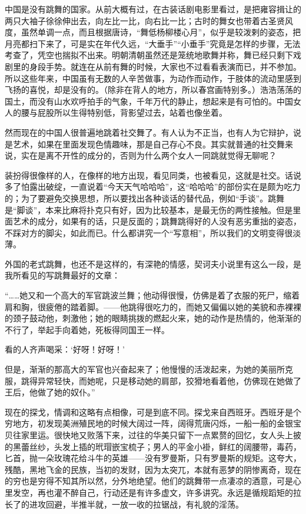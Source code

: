 \par 中国是没有跳舞的国家。从前大概有过，在古装话剧电影里看过，是把雍容揖让的两只大袖子徐徐伸出去，向左比一比，向右比一比；古时的舞女也带着古圣贤风度，虽然单调一点，而且根据唐诗，“舞低杨柳楼心月”，似乎是较泼剌的姿态，把月亮都扫下来了，可是实在年代久远，“大垂手”“小垂手”究竟是怎样的步骤，无法考查了，凭空也揣拟不出来。明朝清朝虽然还是笼统地歌舞并称，舞已经只剩下戏剧里的身段手势。就连在从前有舞的时候，大家也不过看看表演而已，并不参加。所以这些年来，中国虽有无数的人辛苦做事，为动作而动作，于肢体的流动里感到飞扬的喜悦，却是没有的。（除非在背人的地方，所以春宫画特别多。）浩浩荡荡的国土，而没有山水欢呼拍手的气象，千年万代的静止，想起来是有可怕的。中国女人的腰与屁股所以生得特别低，背影望过去，站着也像坐着。
\par 然而现在的中国人很普遍地跳着社交舞了。有人认为不正当，也有人为它辩护，说是艺术，如果在里面发现色情趣味，那是自己存心不良。其实就普通的社交舞来说，实在是离不开性的成分的，否则为什么两个女人一同跳就觉得无聊呢？
\par 装扮得很像样的人，在像样的地方出现，看见同类，也被看见，这就是社交。话说多了怕露出破绽，一直说着“今天天气哈哈哈”，这“哈哈哈”的部份实在是颇为吃力的；为了要避免交换思想，所以要找出各种谈话的替代品，例如“手谈”。跳舞是“脚谈”，本来比麻将扑克只有好，因为比较基本，是最无伤的两性接触。但是里面艺术的成分，如果有的话，只是反面的；跳舞跳得好的人没有恶劣重拙的姿态，不踩对方的脚尖，如此而已。什么都讲究一个“写意相”，所以我们的文明变得很淡薄。
\par 外国的老式跳舞，也还不是这样的，有深艳的情感，契诃夫小说里有这么一段，是我所看见的写跳舞最好的文章：
\par “……她又和一个高大的军官跳波兰舞；他动得很慢，仿佛是着了衣服的死尸，缩着肩和胸，很疲倦的踏着脚。——他跳得很吃力的，而她又偏偏以她的美貌和赤裸裸的颈子鼓动他，刺激他；她的眼睛挑拨的燃起火来，她的动作是热情的，他渐渐的不行了，举起手向着她，死板得同国王一样。
\par 看的人齐声喝采：‘好呀！好呀！’
\par 但是，渐渐的那高大的军官也兴奋起来了；他慢慢的活泼起来，为她的美丽所克服，跳得异常轻快，而她呢，只是移动她的肩部，狡猾地看着他，仿佛现在她做了王后，他做了她的奴仆。”
\par 现在的探戈，情调和这略有点相像，可是到底不同。探戈来自西班牙。西班牙是个穷地方，初发现美洲殖民地的时候大阔过一阵，阔得荒唐闪烁，一船一船的金银宝贝往家里运。很快地又败落下来，过往的华美只留下一点累赘的回忆，女人头上披的黑蕾丝纱，头发上插的玳瑁嵌宝梳子；男人的平金小褂，鲜红的阔腰带，毒药，匕首，抛一朵玫瑰花给斗牛的英雄——没有罗曼斯，只有罗曼斯的规矩。这夸大，残酷，黑地飞金的民族，当初的发财，因为太突兀，本就有恶梦的阴惨离奇，现在的穷也是穷得不知其所以然，分外地绝望。他们的跳舞带一点凄凉的酒意，可是心里发空，再也灌不醉自己，行动还是有许多虚文，许多讲究。永远是循规蹈矩的拉长了的进攻回避，半推半就，一放一收的拉锯战，有礼貌的淫荡。
